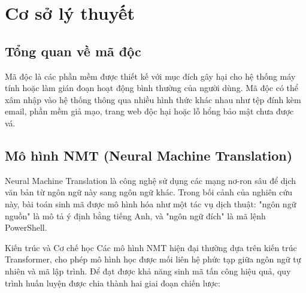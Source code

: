 \chapter{Cơ sở lý thuyết}\label{Chapter2}





\section{Tổng quan về mã độc}

Mã độc là các phần mềm được thiết kế với mục đích gây hại cho hệ thống máy tính hoặc làm gián đoạn hoạt động bình thường của người dùng. Mã độc có thể xâm nhập vào hệ thống thông qua nhiều hình thức khác nhau như tệp đính kèm email, phần mềm giả mạo, trang web độc hại hoặc lỗ hổng bảo mật chưa được vá.



\section{Mô hình NMT (Neural Machine Translation)}

Neural Machine Translation là công nghệ sử dụng các mạng nơ-ron sâu để dịch văn bản từ ngôn ngữ này sang ngôn ngữ khác. Trong bối cảnh của nghiên cứu này, bài toán sinh mã được mô hình hóa như một tác vụ dịch thuật: "ngôn ngữ nguồn" là mô tả ý định bằng tiếng Anh, và "ngôn ngữ đích" là mã lệnh PowerShell. 

Kiến trúc và Cơ chế học Các mô hình NMT hiện đại thường dựa trên kiến trúc Transformer, cho phép mô hình học được mối liên hệ phức tạp giữa ngôn ngữ tự nhiên và mã lập trình. Để đạt được khả năng sinh mã tấn công hiệu quả, quy trình huấn luyện được chia thành hai giai đoạn chiến lược: 

